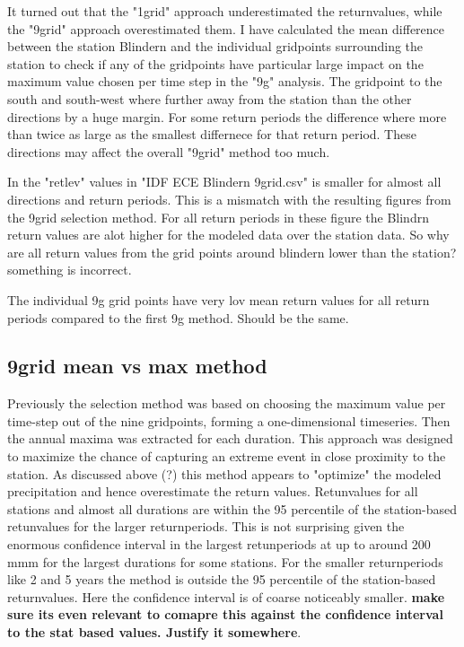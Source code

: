 It turned out that the "1grid" approach underestimated the returnvalues, while the "9grid" approach overestimated them. I have calculated the mean difference between the station Blindern and the individual gridpoints surrounding the station to check if any of the gridpoints have particular large impact on the maximum value chosen per time step in the "9g" analysis. The gridpoint to the south and south-west where further away from the station than the other directions by a huge margin. For some return periods the difference where more than twice as large as the smallest differnece for that return period. These directions may affect the overall "9grid" method too much.   

In the "retlev" values in "IDF ECE Blindern 9grid.csv" is smaller for almost all directions and return periods. This is a mismatch with the resulting figures from the 9grid selection method. For all return periods in these figure the Blindrn return values are alot higher for the modeled data over the station data. So why are all return values from the grid points around blindern lower than the station? something is incorrect.

The individual 9g grid points have very lov mean return values for all return periods compared to the first 9g method. Should be the same. 

\subsection{9grid mean vs max method}
Previously the selection method was based on choosing the maximum value per time-step out of the nine gridpoints, forming a one-dimensional timeseries. Then the annual maxima was extracted for each duration. This approach was designed to maximize the chance of capturing an extreme event in close proximity to the station. As discussed above (?) this method appears to "optimize" the modeled precipitation and hence overestimate the return values. Retunvalues for all stations and almost all durations are within the 95 percentile of the station-based retunvalues for the larger returnperiods. This is not surprising given the enormous confidence interval in the largest retunperiods at up to around 200 mmm for the largest durations for some stations. For the smaller returnperiods like 2 and 5 years the method is outside the 95 percentile of the station-based returnvalues. Here the confidence interval is of coarse noticeably smaller. \textbf{make sure its even relevant to comapre this against the confidence interval to the stat based values. Justify it somewhere}.  

